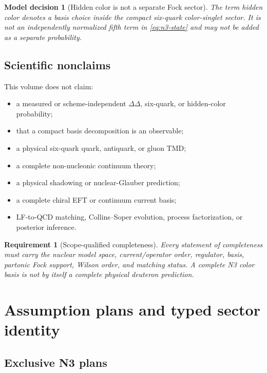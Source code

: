\documentclass[11pt]{article}
\newtheorem{requirement}[definition]{Requirement}
\newtheorem{decision}[definition]{Model decision}
\begin{document}
\begin{decision}[Hidden color is not a separate Fock sector]
The term \emph{hidden color} denotes a basis choice inside the compact six-quark color-singlet sector.  It is not an independently normalized fifth term in \cref{eq:n3-state} and may not be added as a separate probability.
\label{dec:hidden-not-sector}
\end{decision}

\subsection{Scientific nonclaims}

This volume does not claim:
\begin{itemize}
\item a measured or scheme-independent \(\Delta\Delta\), six-quark, or hidden-color probability;
\item that a compact basis decomposition is an observable;
\item a physical six-quark quark, antiquark, or gluon TMD;
\item a complete non-nucleonic continuum theory;
\item a physical shadowing or nuclear-Glauber prediction;
\item a complete chiral EFT or continuum current basis;
\item LF-to-QCD matching, Collins--Soper evolution, process factorization, or posterior inference.
\end{itemize}

\begin{requirement}[Scope-qualified completeness]
Every statement of completeness must carry the nuclear model space, current/operator order, regulator, basis, partonic Fock support, Wilson order, and matching status.  A complete N3 color basis is not by itself a complete physical deuteron prediction.
\label{req:scope-complete}
\end{requirement}

\section{Assumption plans and typed sector identity}
\label{sec:plans}

\subsection{Exclusive N3 plans}
\end{document}
